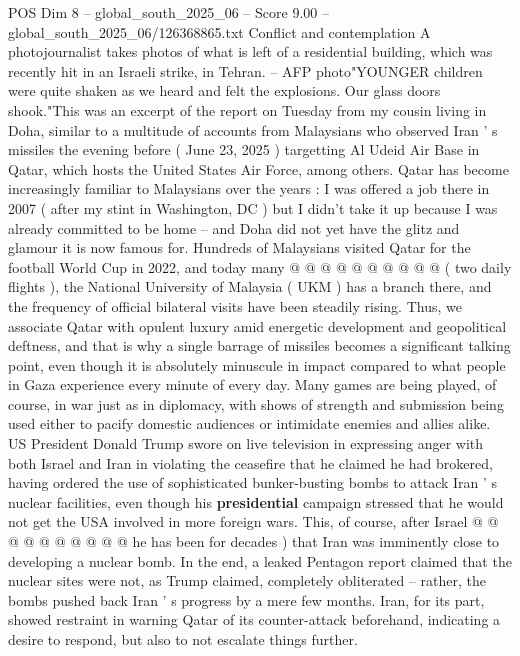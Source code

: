 \begin{textsample}{POS Dim 8 – global\_south\_2025\_06 – Score 9.00 – global\_south\_2025\_06/126368865.txt}  \label{ex:f8_pos_419}
Conflict and contemplation A photojournalist takes photos of what is left of a residential building, which was recently hit in an Israeli strike, in Tehran. -- AFP photo"YOUNGER children were quite shaken as we heard and felt the explosions.
Our glass doors shook."This was an excerpt of the report on Tuesday from my cousin living in Doha, similar to a multitude of accounts from Malaysians who observed Iran ' s missiles the evening before ( June 23, 2025 ) targetting Al Udeid Air Base in Qatar, which hosts the United States Air Force, among others.
Qatar has become increasingly familiar to Malaysians over the years : I was offered a job there in 2007 ( after my stint in Washington, DC ) but I didn't take it up because I was already committed to be home -- and Doha did not yet have the glitz and glamour it is now famous for.
Hundreds of Malaysians visited Qatar for the football World Cup in 2022, and today many @ @ @ @ @ @ @ @ @ @ ( two daily flights ), the National University of Malaysia ( UKM ) has a branch there, and the frequency of official bilateral visits have been steadily rising.
Thus, we associate Qatar with opulent luxury amid energetic development and geopolitical deftness, and that is why a single barrage of missiles becomes a significant talking point, even though it is absolutely minuscule in impact compared to what people in Gaza experience every minute of every day.
Many games are being played, of course, in war just as in diplomacy, with shows of strength and submission being used either to pacify domestic audiences or intimidate enemies and allies alike.
US President Donald Trump swore on live television in expressing anger with both Israel and Iran in violating the ceasefire that he claimed he had brokered, having ordered the use of sophisticated bunker-busting bombs to attack Iran ' s nuclear facilities, even though his \textbf{presidential} campaign stressed that he would not get the USA involved in more foreign wars.
This, of course, after Israel @ @ @ @ @ @ @ @ @ @ he has been for decades ) that Iran was imminently close to developing a nuclear bomb.
In the end, a leaked Pentagon report claimed that the nuclear sites were not, as Trump claimed, completely obliterated -- rather, the bombs pushed back Iran ' s progress by a mere few months.
Iran, for its part, showed restraint in warning Qatar of its counter-attack beforehand, indicating a desire to respond, but also to not escalate things further.

\end{textsample}
